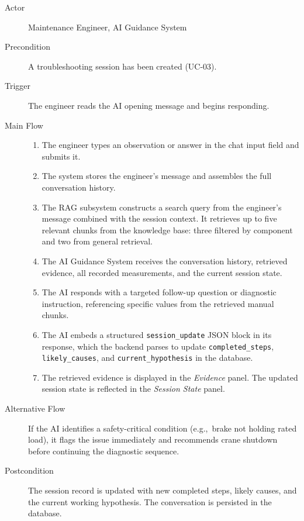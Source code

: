 \begin{description}
    \item[Actor] Maintenance Engineer, AI Guidance System
    \item[Precondition] A troubleshooting session has been created (UC-03).
    \item[Trigger] The engineer reads the AI opening message and begins responding.
    \item[Main Flow]
        \begin{enumerate}[noitemsep]
            \item The engineer types an observation or answer in the chat input field
                  and submits it.
            \item The system stores the engineer's message and assembles the full
                  conversation history.
            \item The RAG subsystem constructs a search query from the engineer's
                  message combined with the session context. It retrieves up to five
                  relevant chunks from the knowledge base: three filtered by component
                  and two from general retrieval.
            \item The AI Guidance System receives the conversation history, retrieved
                  evidence, all recorded measurements, and the current session state.
            \item The AI responds with a targeted follow-up question or diagnostic
                  instruction, referencing specific values from the retrieved manual chunks.
            \item The AI embeds a structured \texttt{session\_update} JSON block in its
                  response, which the backend parses to update \texttt{completed\_steps},
                  \texttt{likely\_causes}, and \texttt{current\_hypothesis} in the database.
            \item The retrieved evidence is displayed in the \textit{Evidence} panel.
                  The updated session state is reflected in the \textit{Session State} panel.
        \end{enumerate}
    \item[Alternative Flow]
        If the AI identifies a safety-critical condition (e.g.,~brake not holding rated
        load), it flags the issue immediately and recommends crane shutdown before
        continuing the diagnostic sequence.
    \item[Postcondition]
        The session record is updated with new completed steps, likely causes, and the
        current working hypothesis. The conversation is persisted in the database.
\end{description}

